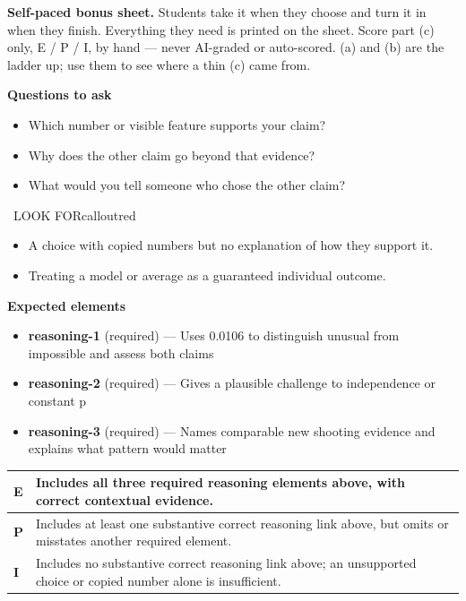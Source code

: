 \documentclass[11pt]{article}
\begin{document}
\textbf{Self-paced bonus sheet.} Students take it when they choose and turn it in when they finish. Everything they need is printed on the sheet. Score part (c) only, E / P / I, by hand --- never AI-graded or auto-scored. (a) and (b) are the ladder up; use them to see where a thin (c) came from.\par

\textbf{Questions to ask}
\begin{itemize}[leftmargin=1.5em,itemsep=2pt,topsep=2pt]
  \item Which number or visible feature supports your claim?
  \item Why does the other claim go beyond that evidence?
  \item What would you tell someone who chose the other claim?
\end{itemize}

\begin{callout}{\IconWarn\ LOOK FOR}{calloutred}
\begin{itemize}[leftmargin=1.5em,itemsep=2pt,topsep=2pt]
  \item A choice with copied numbers but no explanation of how they support it.
  \item Treating a model or average as a guaranteed individual outcome.
\end{itemize}
\end{callout}


\textbf{Expected elements}
\begin{itemize}[leftmargin=1.5em,itemsep=2pt,topsep=2pt]
  \item \textbf{reasoning-1} (required) --- Uses 0.0106 to distinguish unusual from impossible and assess both claims
  \item \textbf{reasoning-2} (required) --- Gives a plausible challenge to independence or constant p
  \item \textbf{reasoning-3} (required) --- Names comparable new shooting evidence and explains what pattern would matter
\end{itemize}

{\small\renewcommand{\arraystretch}{1.25}
\noindent\begin{tabular}{|p{0.5in}|p{5.9in}|}
\hline
\textbf{E} & Includes all three required reasoning elements above, with correct contextual evidence. \\ \hline
\textbf{P} & Includes at least one substantive correct reasoning link above, but omits or misstates another required element. \\ \hline
\textbf{I} & Includes no substantive correct reasoning link above; an unsupported choice or copied number alone is insufficient. \\ \hline
\end{tabular}}
\end{document}
